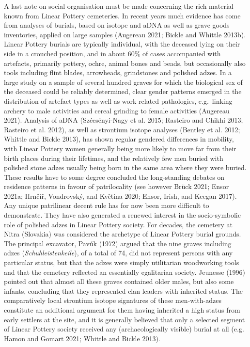 \documentclass[
  12pt,
  a4paper, twoside]{book}
\begin{document}
A last note on social organisation must be made concerning the rich material known from Linear Pottery cemeteries. In recent years much evidence has come from analyses of burials, based on isotope and aDNA as well as grave goods inventories, applied on large samples (Augereau 2021; Bickle and Whittle 2013b). Linear Pottery burials are typically individual, with the deceased lying on their side in a crouched position, and in about 60\% of cases accompanied with artefacts, primarily pottery, ochre, animal bones and beads, but occasionally also tools including flint blades, arrowheads, grindstones and polished adzes. In a large study on a sample of several hundred graves for which the biological sex of the deceased could be reliably determined, clear gender patterns emerged in the distribution of artefact types as well as work-related pathologies, e.g.~linking archery to male activities and cereal grinding to female activities (Augereau 2021). Analysis of aDNA (Szécsényi-Nagy et al. 2015; Rasteiro and Chikhi 2013; Rasteiro et al. 2012), as well as strontium isotope analyses (Bentley et al. 2012; Whittle and Bickle 2013), has shown regular gendered differences in mobility, with Linear Pottery women generally being more likely to move far from their birth places during their lifetimes, and the relatively few men buried with polished stone adzes usually being born in the same area where they were buried. These results have to some degree concluded the long-standing debates on residence patterns in favour of patrilocality (see however Brück 2021; Ensor 2021a; Hrnčíř, Vondrovský, and Květina 2020; Ensor, Irish, and Keegan 2017). Any unique patrilinear decent rule has for now been more difficult to demonstrate. They have also generated a renewed interest in the socio-symbolic role of polished adzes in Linear Pottery society. For decades, the cemetery at Nitra (Slovakia) was considered the archetype of Linear Pottery burial grounds. The principal excavator, Pavúk (1972) argued that the nine graves including adzes (\emph{Schuhleistenkeile}), of a total of 74, did not represent persons with any particular status, but that the adzes were simply utilitarian woodworking tools and that the cemetery reflected an essentially egalitarian society. Jeunesse (1996) pointed out that almost all these graves contained older males, but also some infants, concluding that they represented clan leaders with inherited status. The comparatively local strontium isotope signatures of these men-with-adzes constitute an additional argument for them having inherited a high status from early settlers at the site, and it is generally believed that only a selected segment of Linear Pottery society received any (archaeologically visible) burial at all (e.g. Hamon and Gomart 2021; Whittle and Bickle 2013).
\end{document}
